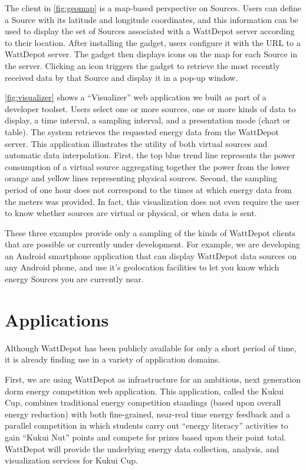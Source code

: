 \documentclass[conference]{IEEEtran}
\begin{document}
The client in \figurename \ref{fig:geomap} is a map-based perspective on
Sources.  Users can define a Source with its latitude and longitude
coordinates, and this information can be used to display the set of Sources
associated with a WattDepot server according to their location.  After
installing the gadget, users configure it with the URL to a WattDepot server.
The gadget then displays icons on the map for each Source in the server.
Clicking an icon triggers the gadget to retrieve the most recently received
data by that Source and display it in a pop-up window.

\figurename \ref{fig:visualizer} shows a ``Visualizer'' web application we built
as part of a developer toolset.  Users select one or more sources, one or
more kinds of data to display, a time interval, a sampling interval, and a
presentation mode (chart or table).  The system retrieves the requested
energy data from the WattDepot server.  This application illustrates the
utility of both virtual sources and automatic data interpolation. First,
the top blue trend line represents the power consumption of a virtual
source aggregating together the power from the lower orange and yellow lines
representing physical sources. Second, the sampling period of one hour does
not correspond to the times at which energy data from the meters was
provided.  In fact, this visualization does not even require the user to
know whether sources are virtual or physical, or when data is sent.

These three examples provide only a sampling of the kinds of WattDepot
clients that are possible or currently under development. For example, we
are developing an Android smartphone application that can display
WattDepot data sources on any Android phone, and use it's geolocation
facilities to let you know which energy Sources you are currently near.

\section{Applications}

Although WattDepot has been publicly available for only a short period of
time, it is already finding use in a variety of application domains. 

First, we are using WattDepot as infrastructure for an ambitious, next
generation dorm energy competition web application.  This application,
called the Kukui Cup, combines traditional energy competition standings
(based upon overall energy reduction) with both fine-grained, near-real
time energy feedback and a parallel competition in which students carry out
``energy literacy'' activities to gain ``Kukui Nut'' points and compete for
prizes based upon their point total.  WattDepot will provide the underlying
energy data collection, analysis, and visualization services for Kukui Cup.
\end{document}
